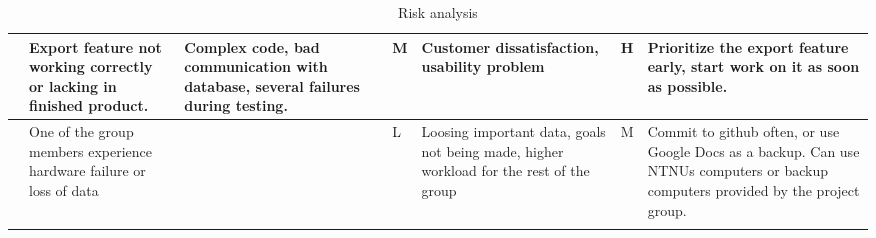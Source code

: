\begin{landscape}
\begin{longtable}{| p{0.4cm} | p{4cm} | p{4cm} | p{2cm} | p{4cm} | p{1cm} | p{4cm} |}
	\centering
		12 &
		Export feature not working correctly or lacking in finished product. &
		Complex code, bad communication with database, several failures during testing. &
		\centering  M &
		Customer dissatisfaction, usability problem &
		\centering H &
		Prioritize the export feature early, start work on it as soon as possible. \\
	\hline

	\centering
		13 &
		One of the group members experience hardware failure or loss of data &
		& \centering L &
		Loosing important data, goals not being made, higher workload for the rest of the group &
		\centering M &
		Commit to github often, or use Google Docs as a backup. Can use NTNUs computers or backup computers provided by the project group. \\
	\hline
\caption{Risk analysis}
\end{longtable}

\end{landscape}
